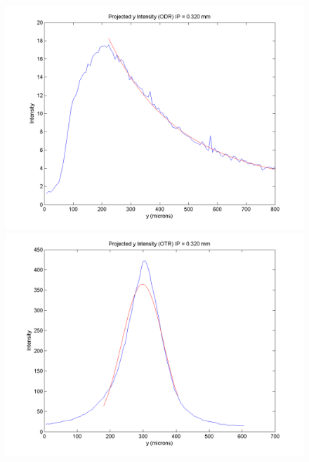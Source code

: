 \documentclass[12pt]{article}
\begin{document}
\begin{figure}
\begin{center}
\includegraphics[scale=0.5]{Figures/ProjY_ODR_320.PNG}
\includegraphics[scale=0.5]{Figures/ProjY_OTR_320.PNG}
\caption{}
\end{center}
\end{figure}
\end{document}
